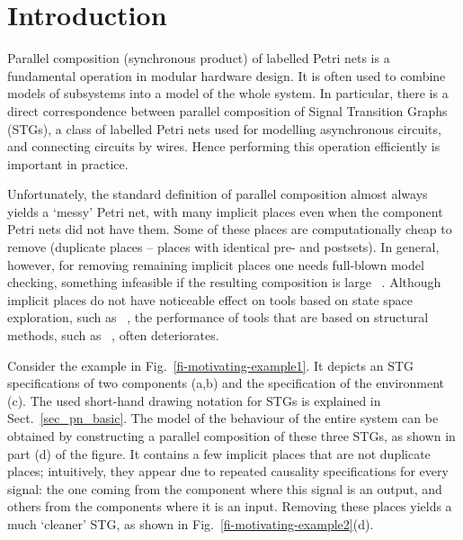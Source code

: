 \section{Introduction}\label{sec:parcomp_intro}

Parallel composition (synchronous product) of labelled
Petri nets is a fundamental operation in modular hardware design. It is
often used to combine models of subsystems into a model of the
whole system. In particular, there is a direct correspondence
between parallel composition of Signal Transition Graphs
(STGs), a class of labelled Petri nets used for modelling
asynchronous circuits, and connecting circuits by wires. Hence
performing this operation efficiently is important in practice.

Unfortunately, the standard definition of parallel composition almost always yields a `messy' Petri net, with many implicit places even when the component Petri nets did not have them. Some of these places are computationally cheap to remove (\eg duplicate places -- places with identical pre- and postsets). In general, however, for removing remaining implicit places one needs full-blown model checking, something infeasible if the resulting composition is large ~\cite{Schaefer06strategiesfor}.
Although implicit places do not have noticeable effect on tools based on state space exploration, such as \petrify~\cite{ckkly97}, the performance of tools that are based on structural methods, such as \desij~\cite{DesiJ}, often deteriorates.

Consider the example in Fig.~\ref{fi-motivating-example1}. It
depicts an STG specifications of two components (a,b) and
the specification of the environment (c). The used short-hand
drawing notation for STGs is explained in
Sect.~\ref{sec_pn_basic}. The model of the behaviour of the
entire system can be obtained by constructing a parallel
composition of these three STGs, as shown in part (d) of
the figure. It contains a few implicit places
that are not duplicate places; intuitively, they appear due
to repeated causality specifications for every signal: the one
coming from the component where this signal is an output, and
others from the components where it is an input. Removing
these places yields a much `cleaner' STG, as
shown in Fig.~\ref{fi-motivating-example2}(d).

